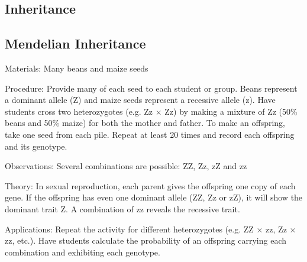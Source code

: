 \begin{multicols}{2}
\columnbreak


\section*{Inheritance}


\subsection{Mendelian Inheritance} %


\begin{description*}
\item[Materials:]{Many beans and maize seeds}
\item[Procedure:]{Provide many of each seed to each student or group. Beans represent a dominant allele (Z) and maize seeds represent a recessive allele (z). Have students cross two heterozygotes (e.g. Zz $\times$ Zz) by making a mixture of Zz (50\% beans and 50\% maize) for both the mother and father. To make an offspring, take one seed from each pile. Repeat at least 20 times and record each offspring and its genotype.}
\item[Observations:]{Several combinations are possible: ZZ, Zz, zZ and zz}
\item[Theory:]{In sexual reproduction, each parent gives the offspring one copy of each gene. If the offspring has even one dominant allele (ZZ, Zz or zZ), it will show the dominant trait Z. A combination of zz reveals the recessive trait.}
\item[Applications:]{Repeat the activity for different heterozygotes (e.g. ZZ $\times$ zz, Zz $\times$ zz, etc.). Have students calculate the probability of an offspring carrying each combination and exhibiting each genotype.}
\end{description*}



\end{multicols}
